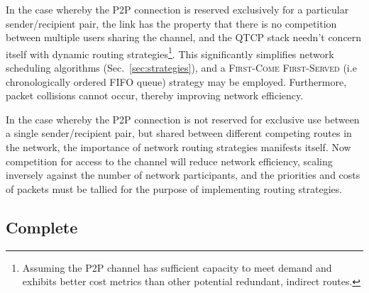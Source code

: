 In the case whereby the P2P connection is reserved exclusively for a particular sender/recipient pair, the link has the property that there is no competition between multiple users sharing the channel, and the QTCP stack needn't concern itself with dynamic routing strategies\footnote{Assuming the P2P channel has sufficient capacity to meet demand and exhibits better cost metrics than other potential redundant, indirect routes.}. This significantly simplifies network scheduling algorithms (Sec.~\ref{sec:strategies}), and a \textsc{First-Come First-Served} (i.e chronologically ordered FIFO queue) strategy may be employed. Furthermore, packet collisions cannot occur, thereby improving network efficiency.

In the case whereby the P2P connection is not reserved for exclusive use between a single sender/recipient pair, but shared between different competing routes in the network, the importance of network routing strategies manifests itself. Now competition for access to the channel will reduce network efficiency, scaling inversely against the number of network participants, and the priorities and costs of packets must be tallied for the purpose of implementing routing strategies.

%
%

\subsection{Complete} 

